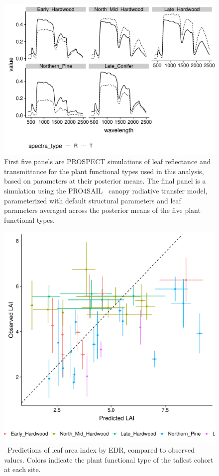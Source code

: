 \begin{figure}
  \centering
  \includegraphics[width=\textwidth]{4_edr/figures/explore_spectra/pft_prospect_sim.pdf}
  \caption{%
    First five panels are PROSPECT simulations of leaf reflectance and transmittance for the plant functional types used in this analysis, based on parameters at their posterior means.
    The final panel is a simulation using the PRO4SAIL~\cite{verhoef_1984_sail} canopy radiative transfer model, parameterized with default structural parameters and leaf parameters averaged across the posterior means of the five plant functional types.
  }
\end{figure}

\begin{figure}
  \centering
  \includegraphics[width=\textwidth]{4_edr/figures/explore_spectra/lai_scatter.pdf}
  \caption{\
    Predictions of leaf area index by EDR, compared to observed values.
    Colors indicate the plant functional type of the tallest cohort at each site.
  }\label{fig:lai_validation}
\end{figure}

